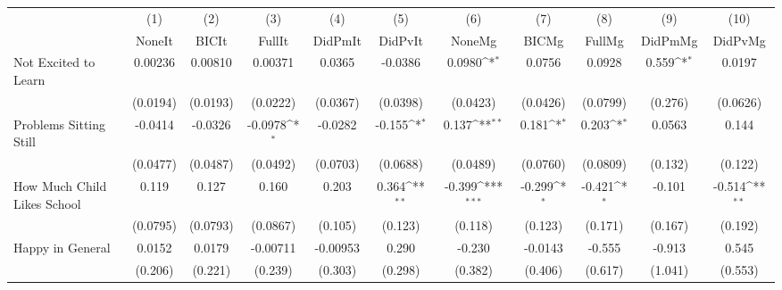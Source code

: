 {
\def\sym#1{\ifmmode^{#1}\else\(^{#1}\)\fi}
\begin{tabular}{l*{10}{c}}
\toprule
            &\multicolumn{1}{c}{(1)}&\multicolumn{1}{c}{(2)}&\multicolumn{1}{c}{(3)}&\multicolumn{1}{c}{(4)}&\multicolumn{1}{c}{(5)}&\multicolumn{1}{c}{(6)}&\multicolumn{1}{c}{(7)}&\multicolumn{1}{c}{(8)}&\multicolumn{1}{c}{(9)}&\multicolumn{1}{c}{(10)}\\
            &\multicolumn{1}{c}{NoneIt}&\multicolumn{1}{c}{BICIt}&\multicolumn{1}{c}{FullIt}&\multicolumn{1}{c}{DidPmIt}&\multicolumn{1}{c}{DidPvIt}&\multicolumn{1}{c}{NoneMg}&\multicolumn{1}{c}{BICMg}&\multicolumn{1}{c}{FullMg}&\multicolumn{1}{c}{DidPmMg}&\multicolumn{1}{c}{DidPvMg}\\
\midrule
Not Excited to Learn&     0.00236         &     0.00810         &     0.00371         &      0.0365         &     -0.0386         &      0.0980\sym{*}  &      0.0756         &      0.0928         &       0.559\sym{*}  &      0.0197         \\
            &    (0.0194)         &    (0.0193)         &    (0.0222)         &    (0.0367)         &    (0.0398)         &    (0.0423)         &    (0.0426)         &    (0.0799)         &     (0.276)         &    (0.0626)         \\
\addlinespace
Problems Sitting Still&     -0.0414         &     -0.0326         &     -0.0978\sym{*}  &     -0.0282         &      -0.155\sym{*}  &       0.137\sym{**} &       0.181\sym{*}  &       0.203\sym{*}  &      0.0563         &       0.144         \\
            &    (0.0477)         &    (0.0487)         &    (0.0492)         &    (0.0703)         &    (0.0688)         &    (0.0489)         &    (0.0760)         &    (0.0809)         &     (0.132)         &     (0.122)         \\
\addlinespace
How Much Child Likes School&       0.119         &       0.127         &       0.160         &       0.203         &       0.364\sym{**} &      -0.399\sym{***}&      -0.299\sym{*}  &      -0.421\sym{*}  &      -0.101         &      -0.514\sym{**} \\
            &    (0.0795)         &    (0.0793)         &    (0.0867)         &     (0.105)         &     (0.123)         &     (0.118)         &     (0.123)         &     (0.171)         &     (0.167)         &     (0.192)         \\
\addlinespace
Happy in General&      0.0152         &      0.0179         &    -0.00711         &    -0.00953         &       0.290         &      -0.230         &     -0.0143         &      -0.555         &      -0.913         &       0.545         \\
            &     (0.206)         &     (0.221)         &     (0.239)         &     (0.303)         &     (0.298)         &     (0.382)         &     (0.406)         &     (0.617)         &     (1.041)         &     (0.553)         \\
\bottomrule
\end{tabular}
}
